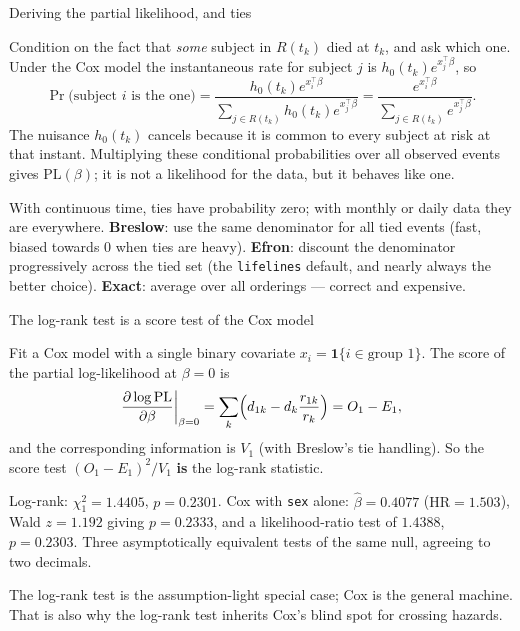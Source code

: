 \documentclass[aspectratio=169,11pt]{beamer}
\begin{document}
\begin{frame}{Deriving the partial likelihood, and ties}
  \footnotesize
  \begin{readme}
    Condition on the fact that \emph{some} subject in $R(t_k)$ died at $t_k$, and ask which
    one. Under the Cox model the instantaneous rate for subject $j$ is
    $h_0(t_k)e^{x_j^\top\beta}$, so
    \[
      \Pr\bigl(\text{subject }i\text{ is the one}\bigr)
      =\frac{h_0(t_k)e^{x_i^\top\beta}}{\sum_{j\in R(t_k)}h_0(t_k)e^{x_j^\top\beta}}
      =\frac{e^{x_i^\top\beta}}{\sum_{j\in R(t_k)}e^{x_j^\top\beta}} .
    \]
    The nuisance $h_0(t_k)$ cancels because it is common to every subject at risk at that
    instant. Multiplying these conditional probabilities over all observed events gives
    $\mathrm{PL}(\beta)$; it is not a likelihood for the data, but it behaves like one.
  \end{readme}
  \begin{readme}[Ties]
    With continuous time, ties have probability zero; with monthly or daily data they are
    everywhere. \textbf{Breslow}: use the same denominator for all tied events (fast,
    biased towards $0$ when ties are heavy). \textbf{Efron}: discount the denominator
    progressively across the tied set (the \texttt{lifelines} default, and nearly always
    the better choice). \textbf{Exact}: average over all orderings --- correct and
    expensive.
  \end{readme}
\end{frame}

\begin{frame}{The log-rank test is a score test of the Cox model}
  \scriptsize
  \begin{readme}
    Fit a Cox model with a single binary covariate $x_i=\mathbf{1}\{i\in\text{group }1\}$.
    The score of the partial log-likelihood at $\beta=0$ is
    \[
      \left.\frac{\partial \log\mathrm{PL}}{\partial\beta}\right|_{\beta=0}
      = \sum_k\Bigl(d_{1k}-d_k\frac{r_{1k}}{r_k}\Bigr) = O_1-E_1 ,
    \]
    and the corresponding information is $V_1$ (with Breslow's tie handling). So the score
    test $(O_1-E_1)^2/V_1$ \textbf{is} the log-rank statistic.
  \end{readme}
  \begin{numexample}
    Log-rank: $\chi^2_1=1.4405$, $p=0.2301$. Cox with \texttt{sex} alone:
    $\hat\beta=0.4077$ ($\mathrm{HR}=1.503$), Wald $z=1.192$ giving $p=0.2333$, and a
    likelihood-ratio test of $1.4388$, $p=0.2303$. Three asymptotically equivalent tests
    of the same null, agreeing to two decimals.
  \end{numexample}
  \begin{takeaway}
    The log-rank test is the assumption-light special case; Cox is the general
    machine. That is also why the log-rank test inherits Cox's blind spot for
    crossing hazards.
  \end{takeaway}
\end{frame}
\end{document}
